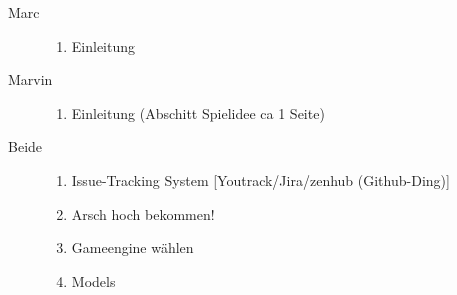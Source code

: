 \begin{description}
	\item[Marc]{
		\begin{enumerate}
			\item{ Einleitung }
		\end{enumerate}
	}
	\item[Marvin]{
		\begin{enumerate}
			\item{ Einleitung (Abschitt Spielidee ca 1 Seite) }
		\end{enumerate}
	}
	\item[Beide]{
		\begin{enumerate}
			\item{Issue-Tracking System [Youtrack/Jira/zenhub (Github-Ding)]}
			\item{Arsch hoch bekommen!}
			\item{Gameengine wählen}
			\item{Models}
		\end{enumerate}
	}
\end{description}
